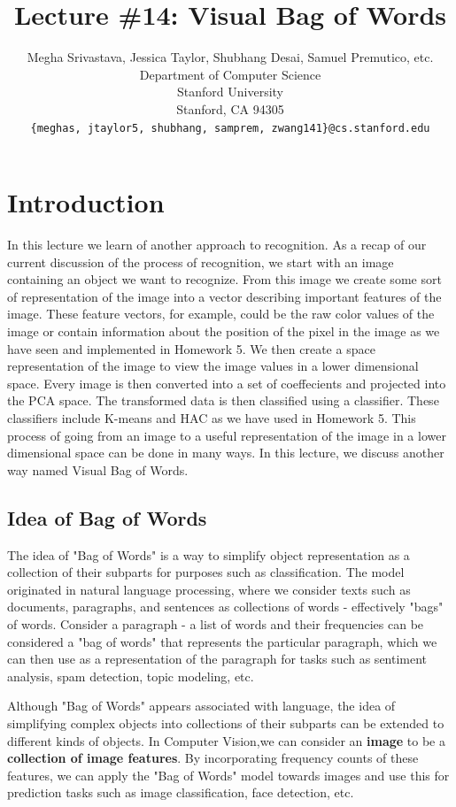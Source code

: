 \documentclass{article}
\title{Lecture \#14: Visual Bag of Words}
\author{
  Megha Srivastava, Jessica Taylor, Shubhang Desai, Samuel Premutico,  etc. \\
  Department of Computer Science\\
  Stanford University\\
  Stanford, CA 94305 \\
  \texttt{\{meghas, jtaylor5, shubhang, samprem, zwang141\}@cs.stanford.edu} \\
}
\begin{document}
\maketitle


\section{Introduction}	
In this lecture we learn of another approach to recognition. As a recap of our current discussion of the process of recognition, we start with an image containing an object we want to recognize. From this image we create some sort of representation of the image into a vector describing important features of the image.  These feature vectors, for example, could be the raw color values of the image or contain information about the position of the pixel in the image as we have seen and implemented in Homework 5. We then create a space representation of the image to view the image values in a lower dimensional space.  Every image is then converted into a set of coeffecients and projected into the PCA space.  The transformed data is then classified using a classifier. These classifiers include K-means and HAC as we have used in Homework 5.  This process of going from an image to a useful representation of the image in a lower dimensional space can be done in many ways.  In this lecture, we discuss another way named Visual Bag of Words.

\subsection{Idea of Bag of Words}
The idea of "Bag of Words" is a way to simplify object representation as a collection of their subparts for purposes such as classification. The model originated in natural language processing, where we consider texts such as documents, paragraphs, and sentences as collections of words - effectively "bags" of words. Consider a paragraph - a list of words and their frequencies can be considered a "bag of words" that represents the particular paragraph, which we can then use as a representation of the paragraph for tasks such as sentiment analysis, spam detection, topic modeling, etc. 

Although "Bag of Words" appears associated with language, the idea of simplifying complex objects into collections of their subparts can be extended to different kinds of objects. In Computer Vision,we can consider an \textbf{image} to be a \textbf{collection of image features}. By incorporating frequency counts of these features, we can apply the "Bag of Words" model towards images and use this for prediction tasks such as image classification, face detection, etc.
\end{document}

